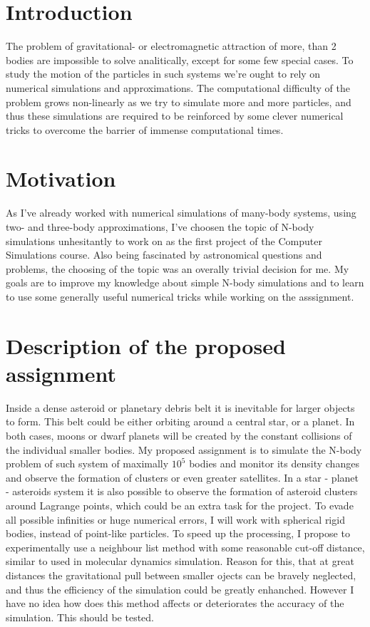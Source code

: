 \begin{abstract}
    \noindent 
\end{abstract}

\begin{multicols}{2}
\section{Introduction}
The problem of gravitational- or electromagnetic attraction of more, than 2 bodies are impossible to solve analitically, except for some few special cases. To study the motion of the particles in such systems we're ought to rely on numerical simulations and approximations. The computational difficulty of the problem grows non-linearly as we try to simulate more and more particles, and thus these simulations are required to be reinforced by some clever numerical tricks to overcome the barrier of immense computational times.

\section{Motivation}
As I've already worked with numerical simulations of many-body systems, using two- and three-body approximations, I've choosen the topic of N-body simulations unhesitantly to work on as the first project of the Computer Simulations course. Also being fascinated by astronomical questions and problems, the choosing of the topic was an overally trivial decision for me. My goals are to improve my knowledge about simple N-body simulations and to learn to use some generally useful numerical tricks while working on the asssignment.

\section{Description of the proposed assignment}
Inside a dense asteroid or planetary debris belt it is inevitable for larger objects to form. This belt could be either orbiting around a central star, or a planet. In both cases, moons or dwarf planets will be created by the constant collisions of the individual smaller bodies. My proposed assignment is to simulate the N-body problem of such system of maximally $10^5$ bodies and monitor its density changes and observe the formation of clusters or even greater satellites. In a star - planet - asteroids system it is also possible to observe the formation of asteroid clusters around Lagrange points, which could be an extra task for the project. \newline
To evade all possible infinities or huge numerical errors, I will work with spherical rigid bodies, instead of point-like particles. To speed up the processing, I propose to experimentally use a neighbour list method with some reasonable cut-off distance, similar to used in molecular dynamics simulation. Reason for this, that at great distances the gravitational pull between smaller ojects can be bravely neglected, and thus the efficiency of the simulation could be greatly enhanched. However I have no idea how does this method affects or deteriorates the accuracy of the simulation. This should be tested.


\end{multicols}
